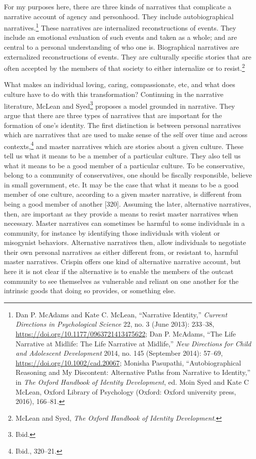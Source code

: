 \documentclass[
  12pt,
]{book}
\theoremstyle{definition}
\theoremstyle{definition}
\theoremstyle{definition}
\theoremstyle{definition}
\theoremstyle{remark}
\begin{document}
For my purposes here, there are three kinds of narratives that complicate a narrative account of agency and personhood. They include autobiographical narratives.\footnote{Dan P. McAdams and Kate C. McLean, {``Narrative {Identity},''} \emph{Current Directions in Psychological Science} 22, no. 3 (June 2013): 233--38, \url{https://doi.org/10.1177/0963721413475622}; Dan P. McAdams, {``The {Life Narrative} at {Midlife}: {The Life Narrative} at {Midlife},''} \emph{New Directions for Child and Adolescent Development} 2014, no. 145 (September 2014): 57--69, \url{https://doi.org/10.1002/cad.20067}; Monisha Pasupathi, {``Autobiographical {Reasoning} and {My} {Discontent}: {Alternative Paths} from {Narrative} to {Identity},''} in \emph{The {Oxford} Handbook of Identity Development}, ed. Moin Syed and Kate C McLean, Oxford Library of Psychology (Oxford: Oxford university press, 2016), 166--81.} These narratives are internalized reconstructions of events. They include an emotional evaluation of such events and taken as a whole; and are central to a personal understanding of who one is. Biographical narratives are externalized reconstructions of events. They are culturally specific stories that are often accepted by the members of that society to either internalize or to resist.\footnote{McLean and Syed, \emph{The {Oxford} Handbook of Identity Development}.}

What makes an individual loving, caring, compassionate, etc, and what does culture have to do with this transformation? Continuing in the narrative literature, McLean and Syed\footnote{Ibid.} proposes a model grounded in narrative. They argue that there are three types of narratives that are important for the formation of one's identity. The first distinction is between personal narratives which are narratives that are used to make sense of the self over time and across contexts,\footnote{Ibid., 320--21.} and master narratives which are stories about a given culture. These tell us what it means to be a member of a particular culture. They also tell us what it means to be a good member of a particular culture. To be conservative, belong to a community of conservatives, one should be fiscally responsible, believe in small government, etc. It may be the case that what it means to be a good member of one culture, according to a given master narrative, is different from being a good member of another {[}320{]}. Assuming the later, alternative narratives, then, are important as they provide a means to resist master narratives when necessary. Master narratives can sometimes be harmful to some individuals in a community, for instance by identifying those individuals with violent or misogynist behaviors. Alternative narratives then, allow individuals to negotiate their own personal narratives as either different from, or resistant to, harmful master narratives. Crispin offers one kind of alternative narrative account, but here it is not clear if the alternative is to enable the members of the outcast community to see themselves as vulnerable and reliant on one another for the intrinsic goods that doing so provides, or something else.
\end{document}
